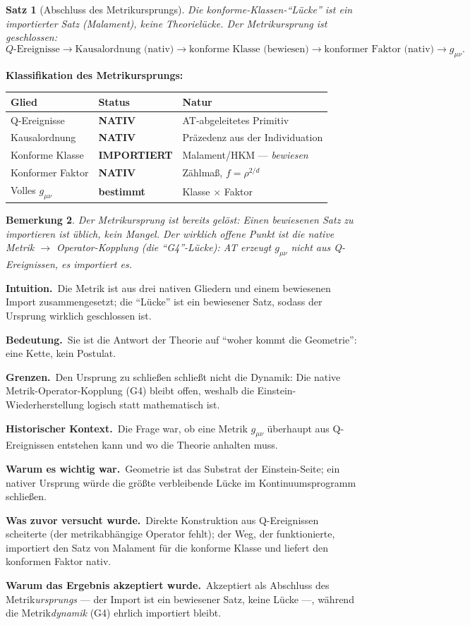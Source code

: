\documentclass[10pt,twoside,openany]{book}
\newtheorem{theorem}{Satz}[chapter]
\newtheorem{remark}[theorem]{Bemerkung}
\newcommand{\theoremnotes}[3]{%
  \par\medskip\noindent
  \textbf{Intuition.}\ #1\par
  \textbf{Bedeutung.}\ #2\par
  \textbf{Grenzen.}\ #3\par}
\newcommand{\historynotes}[4]{%
  \par\smallskip\noindent
  \textbf{Historischer Kontext.}\ #1\par
  \textbf{Warum es wichtig war.}\ #2\par
  \textbf{Was zuvor versucht wurde.}\ #3\par
  \textbf{Warum das Ergebnis akzeptiert wurde.}\ #4\par}
\begin{document}
\begin{theorem}[Abschluss des Metrikursprungs]
Die konforme-Klassen-``Lücke'' ist ein \emph{importierter Satz} (Malament), keine
Theorielücke. Der Metrikursprung ist geschlossen:
\begin{equation}
Q\text{-Ereignisse} \to \text{Kausalordnung (nativ)}
\to \text{konforme Klasse (bewiesen)}
\to \text{konformer Faktor (nativ)}
\to g_{\mu\nu}.
\end{equation}
\end{theorem}

\textbf{Klassifikation des Metrikursprungs:}

\begin{center}
\begin{tabular}{lll}
\toprule
Glied & Status & Natur \\
\midrule
Q-Ereignisse & \textbf{NATIV} & AT-abgeleitetes Primitiv \\
Kausalordnung & \textbf{NATIV} & Präzedenz aus der Individuation \\
Konforme Klasse & \textbf{IMPORTIERT} & Malament/HKM — \emph{bewiesen} \\
Konformer Faktor & \textbf{NATIV} & Zählmaß, $f=\rho^{2/d}$ \\
Volles $g_{\mu\nu}$ & \textbf{bestimmt} & Klasse $\times$ Faktor \\
\bottomrule
\end{tabular}
\end{center}

\begin{remark}
Der Metrikursprung ist \emph{bereits gelöst}: Einen bewiesenen Satz zu importieren ist
üblich, kein Mangel. Der wirklich offene Punkt ist die \emph{native} Metrik $\to$
Operator-Kopplung (die ``G4''-Lücke): AT erzeugt $g_{\mu\nu}$ nicht aus Q-Ereignissen,
es importiert es.
\end{remark}

\theoremnotes
{Die Metrik ist aus drei nativen Gliedern und einem bewiesenen Import zusammengesetzt;
die ``Lücke'' ist ein bewiesener Satz, sodass der Ursprung wirklich geschlossen ist.}
{Sie ist die Antwort der Theorie auf ``woher kommt die Geometrie'': eine Kette, kein
Postulat.}
{Den Ursprung zu schließen schließt nicht die Dynamik: Die native
Metrik-Operator-Kopplung (G4) bleibt offen, weshalb die Einstein-Wiederherstellung
logisch statt mathematisch ist.}

\historynotes
{Die Frage war, ob eine Metrik $g_{\mu\nu}$ überhaupt aus Q-Ereignissen entstehen kann und
wo die Theorie anhalten muss.}
{Geometrie ist das Substrat der Einstein-Seite; ein nativer Ursprung würde die größte
verbleibende Lücke im Kontinuumsprogramm schließen.}
{Direkte Konstruktion aus Q-Ereignissen scheiterte (der metrikabhängige Operator fehlt);
der Weg, der funktionierte, importiert den Satz von Malament für die konforme Klasse und
liefert den konformen Faktor nativ.}
{Akzeptiert als Abschluss des Metrik\emph{ursprungs} --- der Import ist ein bewiesener
Satz, keine Lücke ---, während die Metrik\emph{dynamik} (G4) ehrlich importiert bleibt.}
\end{document}
